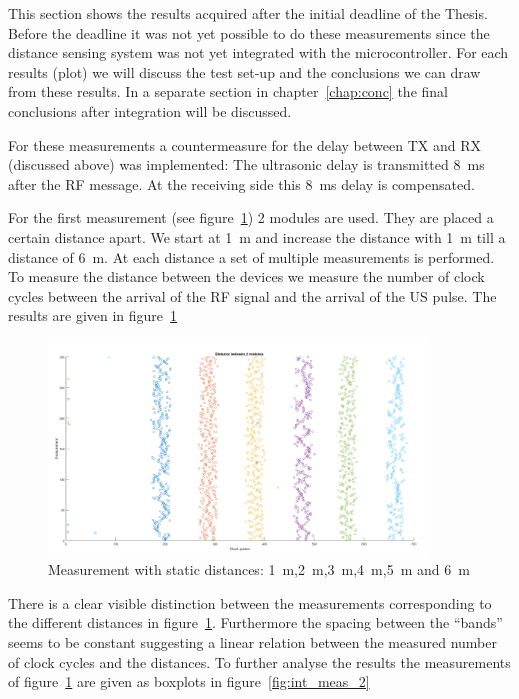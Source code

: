 This section shows the results acquired after the initial deadline of the Thesis.
Before the deadline it was not yet possible to do these measurements since the distance sensing system was not yet integrated with the microcontroller.
For each results (plot) we will discuss the test set-up and the conclusions we can draw from these results.
In a separate section in chapter~\ref{chap:conc} the final conclusions after integration will be discussed.

For these measurements a countermeasure for the delay between TX and RX (discussed above) was implemented:
The ultrasonic delay is transmitted \SI{8}{\milli\second} after the RF message.
At the receiving side this \SI{8}{\milli\second} delay is compensated.

For the first measurement (see figure~\ref{fig:int_meas_1}) 2 modules are used.
They are placed a certain distance apart.
We start at \SI{1}{\meter} and increase the distance with \SI{1}{\meter} till a distance of \SI{6}{\meter}.
At each distance a set of multiple measurements is performed.
To measure the distance between the devices we measure the number of clock cycles between the arrival of the RF signal and the arrival of the US pulse.
The results are given in figure~\ref{fig:int_meas_1}

\begin{figure}[H]
\centering
\includegraphics[width=0.9\textwidth]{Figures/Distance_6.png}
\caption{Measurement with static distances: \SI{1}{\meter},\SI{2}{\meter},\SI{3}{\meter},\SI{4}{\meter},\SI{5}{\meter} and \SI{6}{\meter}}
\label{fig:int_meas_1}
\end{figure}

There is a clear visible distinction between the measurements corresponding to the different distances in figure~\ref{fig:int_meas_1}.
Furthermore the spacing between the ``bands'' seems to be constant suggesting a linear relation between the measured number of clock cycles and the distances.
To further analyse the results the measurements of figure~\ref{fig:int_meas_1} are given as boxplots in figure~\ref{fig:int_meas_2}

